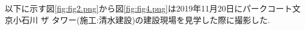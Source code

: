 以下に示す図\ref{fig:fig2.png}から図\ref{fig:fig4.png}は2019年11月20日にパークコート文京小石川 ザ タワー(施工:清水建設)の建設現場を見学した際に撮影した.
\begin{figure}[htbp]
  \begin{minipage}{0.5\hsize}
  \end{minipage}
  \begin{minipage}{0.5\hsize}
  \end{minipage}
\end{figure}
\begin{figure}[htbp]
  \begin{minipage}{0.5\hsize}
  \end{minipage}
  \begin{minipage}{0.5\hsize}
  \end{minipage}
\end{figure}
